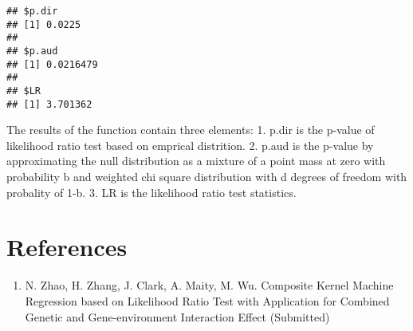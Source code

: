 \documentclass[11pt,]{article}
\providecommand{\tightlist}{%
\setlength{\itemsep}{0pt}\setlength{\parskip}{0pt}}
\begin{document}
\begin{verbatim}
## $p.dir
## [1] 0.0225
## 
## $p.aud
## [1] 0.0216479
## 
## $LR
## [1] 3.701362
\end{verbatim}

The results of the function contain three elements: 1. p.dir is the
p-value of likelihood ratio test based on emprical distrition. 2. p.aud
is the p-value by approximating the null distribution as a mixture of a
point mass at zero with probability b and weighted chi square
distribution with d degrees of freedom with probality of 1-b. 3. LR is
the likelihood ratio test statistics.

\section{References}\label{references}

\begin{enumerate}
\def\labelenumi{\arabic{enumi}.}
\tightlist
\item
  N. Zhao, H. Zhang, J. Clark, A. Maity, M. Wu. Composite Kernel Machine
  Regression based on Likelihood Ratio Test with Application for
  Combined Genetic and Gene-environment Interaction Effect (Submitted)
\end{enumerate}




\newpage
\singlespacing 
\end{document}
